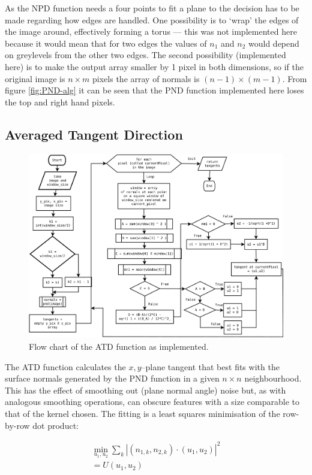 \documentclass[11pt,a4paper]{article}
\begin{document}
\begin{multicols}{2}
		As the NPD function needs a four points to fit a plane to the decision has to be made regarding how edges are handled. One possibility is to `wrap' the edges of the image around, effectively forming a torus --- this was not implemented here because it would mean that for two edges the values of $n_1$ and $n_2$ would depend on greylevels from the other two edges. The second possibility (implemented here) is to make the output array smaller by 1 pixel in both dimensions, so if the original image is $n \times m$ pixels the array of normals is $(n-1) \times (m-1)$. From figure \ref{fig:PND-alg} it can be seen that the PND function implemented here loses the top and right hand pixels.

	\subsection{Averaged Tangent Direction}
        \begin{figure}
        \centering
        \includegraphics[width = \textwidth]{ATD.pdf}
        \caption{Flow chart of the ATD function as implemented.}
        \label{fig:ATD-alg}
      \end{figure}
		The ATD function calculates the $x,y$--plane tangent that best fits with the surface normals generated by the PND function in a given $n \times n$ neighbourhood. This has the effect of smoothing out (plane normal angle) noise but, as with analogous smoothing operations, can obscure features with a size comparable to that of the kernel chosen. The fitting is a least squares minimisation of the row-by-row dot product:

		\begin{equation}
		\begin{split}
			\min_{u_1, u_2} \sum_k |(n_{1,k}, n_{2,k}) \cdot (u_1, u_2)|^2 \\
			= U(u_1, u_2)
		\end{split}
		\end{equation}


\end{multicols}
\end{document}
